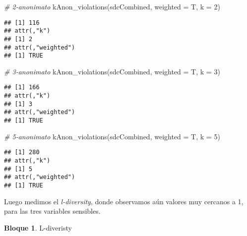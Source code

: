 \documentclass[
]{book}
\newenvironment{Shaded}{\begin{snugshade}}{\end{snugshade}}
\newcommand{\AttributeTok}[1]{\textcolor[rgb]{0.77,0.63,0.00}{#1}}
\newcommand{\CommentTok}[1]{\textcolor[rgb]{0.56,0.35,0.01}{\textit{#1}}}
\newcommand{\ConstantTok}[1]{\textcolor[rgb]{0.00,0.00,0.00}{#1}}
\newcommand{\DecValTok}[1]{\textcolor[rgb]{0.00,0.00,0.81}{#1}}
\newcommand{\FunctionTok}[1]{\textcolor[rgb]{0.00,0.00,0.00}{#1}}
\newcommand{\NormalTok}[1]{#1}
\newcommand{\OtherTok}[1]{\textcolor[rgb]{0.56,0.35,0.01}{#1}}
\newcommand{\SpecialCharTok}[1]{\textcolor[rgb]{0.00,0.00,0.00}{#1}}
\theoremstyle{definition}
\theoremstyle{definition}
\newtheorem{example}{Bloque}[chapter]
\theoremstyle{definition}
\theoremstyle{definition}
\theoremstyle{remark}
\begin{document}
\begin{Shaded}
\begin{Highlighting}[]
\CommentTok{\# 2{-}anonimato}
\FunctionTok{kAnon\_violations}\NormalTok{(sdcCombined, }\AttributeTok{weighted =}\NormalTok{ T, }\AttributeTok{k =} \DecValTok{2}\NormalTok{) }
\end{Highlighting}
\end{Shaded}

\begin{verbatim}
## [1] 116
## attr(,"k")
## [1] 2
## attr(,"weighted")
## [1] TRUE
\end{verbatim}

\begin{Shaded}
\begin{Highlighting}[]
\CommentTok{\# 3{-}anonimato}
\FunctionTok{kAnon\_violations}\NormalTok{(sdcCombined, }\AttributeTok{weighted =}\NormalTok{ T, }\AttributeTok{k =} \DecValTok{3}\NormalTok{) }
\end{Highlighting}
\end{Shaded}

\begin{verbatim}
## [1] 166
## attr(,"k")
## [1] 3
## attr(,"weighted")
## [1] TRUE
\end{verbatim}

\begin{Shaded}
\begin{Highlighting}[]
\CommentTok{\# 5{-}anonimato}
\FunctionTok{kAnon\_violations}\NormalTok{(sdcCombined, }\AttributeTok{weighted =}\NormalTok{ T, }\AttributeTok{k =} \DecValTok{5}\NormalTok{) }
\end{Highlighting}
\end{Shaded}

\begin{verbatim}
## [1] 280
## attr(,"k")
## [1] 5
## attr(,"weighted")
## [1] TRUE
\end{verbatim}

Luego medimos el \emph{l-diversity}, donde observamos aún valores muy cercanos a 1, para las tres variables sensibles.

\begin{example}
\protect\hypertarget{exm:bloque57nbm}{}\label{exm:bloque57nbm}L-diveristy
\end{example}

\begin{Shaded}
\end{Shaded}
\end{document}
